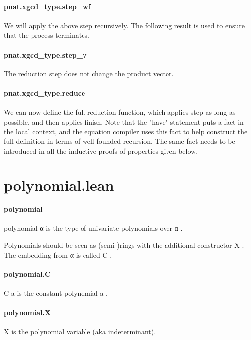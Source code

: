 \documentclass{article}
\begin{document}
\paragraph{pnat.xgcd\_type.step\_wf}
\par
We will apply the above step recursively.  The following result
is used to ensure that the process terminates.
\paragraph{pnat.xgcd\_type.step\_v}
\par
The reduction step does not change the product vector.
\paragraph{pnat.xgcd\_type.reduce}
\par
We can now define the full reduction function, which applies
step as long as possible, and then applies finish. Note that the
"have" statement puts a fact in the local context, and the
equation compiler uses this fact to help construct the full
definition in terms of well-founded recursion.  The same fact
needs to be introduced in all the inductive proofs of properties
given below.
\section{polynomial.lean}\paragraph{polynomial}
\par
\colorbox[RGB]{253,246,227}{{{{\color[RGB]{101, 123, 131} polynomial α }}}} is the type of univariate polynomials over 
\colorbox[RGB]{253,246,227}{{{{\color[RGB]{101, 123, 131} α }}}}.
\par
Polynomials should be seen as (semi-)rings with the additional constructor 
\colorbox[RGB]{253,246,227}{{{{\color[RGB]{101, 123, 131} X }}}}.
The embedding from α is called 
\colorbox[RGB]{253,246,227}{{{{\color[RGB]{101, 123, 131} C }}}}.
\paragraph{polynomial.C}
\par
\colorbox[RGB]{253,246,227}{{{{\color[RGB]{101, 123, 131} C a }}}} is the constant polynomial 
\colorbox[RGB]{253,246,227}{{{{\color[RGB]{101, 123, 131} a }}}}.
\paragraph{polynomial.X}
\par
\colorbox[RGB]{253,246,227}{{{{\color[RGB]{101, 123, 131} X }}}} is the polynomial variable (aka indeterminant).
\end{document}
